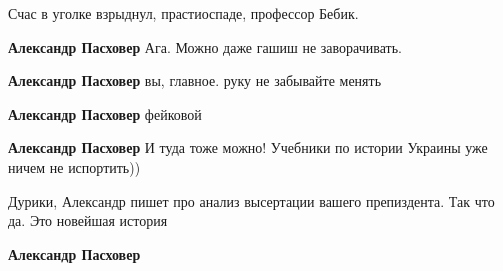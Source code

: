 \begin{itemize}
\begin{itemize}
Счас в уголке взрыднул, прастиоспаде, профессор Бебик.

 
\textbf{Александр Пасховер} Ага. Можно даже гашиш не заворачивать.

 

\textbf{Александр Пасховер} вы, главное. руку не забывайте менять

 
\textbf{Александр Пасховер} фейковой

 
\textbf{Александр Пасховер}
И туда тоже можно! Учебники по истории Украины уже ничем не испортить))

 
Дурики, Александр пишет про анализ высертации вашего препиздента. Так что да. Это новейшая история 🤣

 
\textbf{Александр Пасховер}

 

\end{itemize}
\end{itemize}
